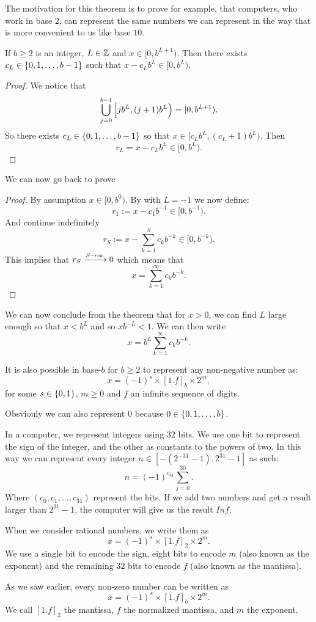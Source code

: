 \documentclass[11pt,a4paper]{article}
\begin{document}
The motivation for this theorem is to prove for example, that computers,
who work in base $2$, can represent the same numbers we can represent
in the way that is more convenient to us like base $10$.

\begin{lemma}
  \label{lem:bases}
  If $b \geq 2$ is an integer, $L \in \mathbb{Z}$ and $x \in [0,b^{L+1})$.
  Then there exists $c_L \in \set{0,1,\dots,b-1}$ such that
  $x - c_L b^{L} \in [0,b^L)$.
\end{lemma}
\begin{proof}
  We notice that
  \[
    \bigcup_{j=0}^{b-1} \intco{j b^L, (j + 1) b^L} =
    [0, b^{L+1}).
  \]
  So there exists $c_L \in \set{0,1,\dots,b-1}$ so that 
  $x \in [c_L b^L, (c_L + 1) b^L)$.
  Then
  \[
    r_L = x - c_L b^L \in [0,b^L).
  \]
\end{proof}

We can now go back to prove 

\begin{proof}
  By assumption $x \in [0,b^0)$.
  By  with $L = -1$ we now define:
  \[
    r_1 := x - c_1 b^{-1} \in [0,b^{-1}).
  \]
  And continue indefinitely
  \[
    r_S := x - \sum_{k=1}^{S} c_k b^{-k} \in [0,b^{-k}).
  \]
  This implies that $r_S \xrightarrow{S \to \infty} 0$ which means that
  \[
    x = \sum_{k=1}^{\infty} c_k b^{-k}.
  \]
\end{proof}

We can now conclude from the theorem that for $x > 0$, we can find $L$
large enough so that $x < b^L$ and so $x b^{-L} < 1$.
We can then write
\[
  x = b^L \sum_{k=1}^{\infty} c_k b^{-k}.
\]

It is also possible in base-$b$ for $b \geq 2$ to represent any
non-negative number as:
\[
  x = (-1)^s \times [1.f]_b \times 2^m,
\]
for some $s \in \set{0,1}$, $m \geq 0$ and $f$ an infinite sequence
of digits.

\begin{remark}
  Obsviouly we can also represent $0$ because $0 \in \set{0,1,\dots,b}$.
\end{remark}

In a computer, we represent integers using $32$ bits.
We use one bit to represent the sign of the integer,
and the other as constants to the powers of two.
In this way we can represent every integer 
$n \in [- (2^{-31} - 1), 2^{31} - 1]$ as such:
\[
  n = (-1)^{c_31} \sum_{j=0}^{30}.
\]
Where $(c_0,c_1,\dots,c_{31})$ represent the bits.
If we add two numbers and get a result larger than $2^31 - 1$,
the computer will give us the result $Inf$.

When we consider rational numbers, we write them as
\[
    x = (-1)^s \times [1.f]_2 \times 2^m.
\]
We use a single bit to encode the sign, eight bits to encode $m$ (also
known as the exponent) and the remaining $32$ bits to encode $f$ (also known
as the mantissa).

\begin{definition}[Mantissa]
  As we saw earlier, every non-zero number can be written as
  \[
    x = (-1)^s \times [1.f]_b \times 2^m.
  \]
  We call $[1.f]_2$ the mantissa, $f$ the normalized mantissa, and
  $m$ the exponent.
\end{definition}
\end{document}

